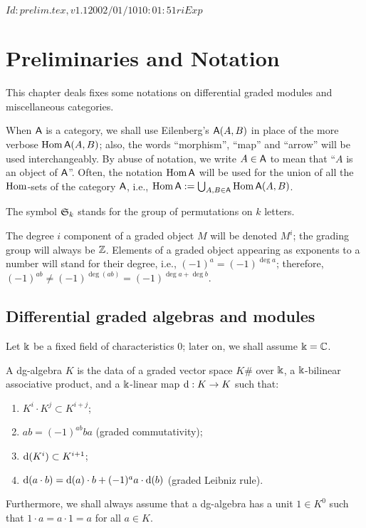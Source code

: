 \RCSID $Id: prelim.tex,v 1.1 2002/01/10 10:01:51 ri Exp $


\chapter{Preliminaries and Notation}

This chapter deals fixes some notations on differential graded modules
and miscellaneous categories. 

When $\mathsf{A}$ is a category, we shall use Eilenberg's $\mathsf{A}(A, B)$ in place
of the more verbose $\operatorname{Hom} \mathsf{A}(A, B)$; also, the words ``morphism'',
``map'' and ``arrow'' will be used interchangeably. By abuse of
notation, we write $A \in \mathsf{A}$ to mean that ``$A$ is an object of
$\mathsf{A}$''. Often, the notation $\operatorname{Hom}\mathsf{A}$ will be used for the union of all
the $\operatorname{Hom}$-sets of the category $\mathsf{A}$, i.e., $\operatorname{Hom}\mathsf{A} := \bigcup_{A,B \in \mathsf{A}}
\operatorname{Hom}\mathsf{A}(A,B)$.

The symbol $\mathfrak{S}_{k}$ stands for the group of permutations on $k$
letters.

The degree $i$ component of a graded object $M$ will be denoted
$M^i$; the grading group will always be $\mathbb{Z}$. Elements of a graded
object appearing as exponents to a number will stand for their degree,
i.e., $(-1)^a = (-1)^{\deg a}$; therefore, $(-1)^{ab} \not=
(-1)^{\deg (ab)} = (-1)^{\deg a + \deg b}$.


\section{Differential graded algebras and modules}
\label{sec:dg-things}

Let $\Bbbk$ be a fixed field of characteristics $0$; later on, we shall
assume $\Bbbk = \mathbb{C}$.
\begin{definition}
  A dg-algebra $K$ is the data of a graded vector space $K\#$
  over $\Bbbk$, a $\Bbbk$-bilinear associative product, and a
  $\Bbbk$-linear map $\mathrm{d}: K\to K$ such that:
  \begin{enumerate}
  \item $K^i \cdot K^j \subset K^{i+j}$;
  \item $ab = (-1)^{ab} ba$ (graded commutativity);
  \item $\mathrm{d}(K^i) \subset K^{i+1}$;
  \item $\mathrm{d}(a\cdot b) = \mathrm{d}(a)\cdot b + (-1)^a a\cdot\mathrm{d}(b)$ (graded Leibniz rule).
  \end{enumerate}
  Furthermore, we shall always assume that a dg-algebra has a unit
  $1\in K^0$ such that $1\cdot a = a\cdot 1 = a$ for all $a\in
  K$.
\end{definition}

